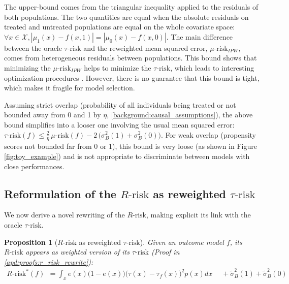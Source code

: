 \documentclass{report}
\newtheorem{proposition}{Proposition}
\begin{document}
The upper-bound comes from the triangular inequality applied to the residuals of
both populations. The two quantities are equal when the
absolute residuals on treated and untreated populations are equal on the
whole covariate space:
$\forall x \in \mathcal X, |\mu_1(x) - f(x, 1)| = |\mu_0(x) - f(x, 0)|$.
The main difference between the oracle $\tau \text{-risk}$ and the
reweighted mean squared error, $\mu\text{-risk}_{IPW}$, comes from heterogeneous
residuals between populations.
%
This bound shows that minimizing the $\mu\text{-risk}_{IPW}$ helps to
minimize the $\tau\text{-risk}$, which leads to
interesting optimization procedures \citep{johansson2022generalization}. However, there is no
guarantee that this bound is tight, which makes it fragile for model
selection.

Assuming strict overlap (probability of all individuals being treated or not
bounded away from 0 and 1 by $\eta$, \ref{background:causal_assumptions}), the
above bound simplifies into a looser one involving the usual mean squared error:
$\tau\text{-risk}(f)\leq \frac{2}{\eta}\, \mu\text{-risk}(f) -  2 \, \big(\sigma^2_{B}(1) +  \sigma^2_{B}(0)\big)$. For weak overlap (propensity scores not bounded far from 0
or 1), this bound is very loose (as shown in Figure \ref{fig:toy_example})
and is not appropriate to discriminate between models with close performances.


\subsection{Reformulation of the $R\text{-risk}$ as reweighted $\tau\text{-risk}$}%
\label{theory:r_risk_rewrite}%

We now derive a novel rewriting of the $R\text{-risk}$, making explicit its link
with the oracle $\tau \text{-risk}$.

\begin{proposition}[$R \text{-risk}$ as reweighted
    $\tau\text{-risk}$]\label{theory:prop:r_risk_rewrite} Given an outcome model
  $f$, its $R\text{-risk}$ appears as weighted version of its $\tau\text{-risk}$
  (Proof in \ref{apd:proofs:r_risk_rewrite}):
  \begin{align}
    R\text{-risk}^*(f) & = \int_{x} e(x)\big(1-e(x)\big)\big(\tau(x)-\tau_ {f}(x)\big)^{2} p(x) d x  \quad\; + \tilde{\sigma}_B^2(1) + \tilde{\sigma}_B^{2}(0)
  \end{align}
\end{proposition}
\end{document}
